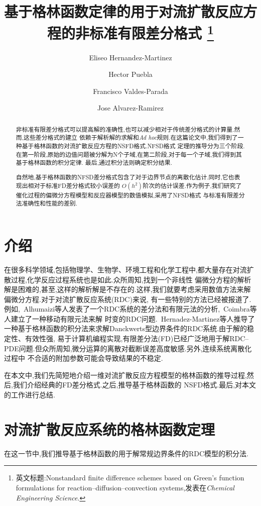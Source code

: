 \documentclass[a4paper,cs4size,adobefonts,cm-default,no-math]{ctexart}
\begin{document}
\setlength{\baselineskip}{22pt}

\title{\kaishu 基于格林函数定律的用于对流扩散反应方程的非标准有限差分格式
      \footnote{英文标题:Nonstandard finite difference schemes based on Green's function
formulations for reaction--diffusion--convection systems,发表在\textit{Chemical Engineering Science}.}}
\author{Eliseo Hernandez-Martinez \and Hector Puebla \and Francisco Valdes-Parada \and Jose Alvarez-Ramirez}
\date{}
\maketitle
\begin{abstract}
非标准有限差分格式可以提高解的准确性,也可以减少相对于传统差分格式的计算量.然而,这些差分格式的建立
依赖于解析解的求解和\textit{Ad hoc}规则.在这篇论文中,我们得到了一种基于格林函数的对流扩散反应方程的NSFD格式.NFSD格式
定理的推导分为三个阶段.在第一阶段,原始的边值问题被分解为N个子域,在第二阶段,对于每一个子域,我们得到其基于格林函数的积分定律.
最后,通过积分法则确定积分结果.\par
自然地,基于格林函数的NFSD差分格式包含了对于边界节点的离散化估计.同时,它也表现出相对于标准FD差分格式较小误差的
$O(h^2)$阶次的估计误差.作为例子,我们研究了催化过程的偏微分方程模型和反应器模型的数值模拟,采用了NFSD格式
与标准有限差分法准确性和性能的差别.
\end{abstract}
\thispagestyle{empty}
\newpage
\section{介绍}
在很多科学领域,包括物理学、生物学、环境工程和化学工程中,都大量存在对流扩散过程,化学反应过程系统也是如此.众所周知,找到一个非线性
偏微分方程的解析解是困难的,甚至,这样的解析解是不存在的.这样,我们就要考虑采用数值方法来解偏微分方程.对于对流扩散反应系统(RDC)来说,
有一些特别的方法已经被报道了.例如,~Alhumaizi等人发表了一个RDC系统的差分法和有限元法的分析,~Coimbra等人建立了一种移动有限元法来解
时变的RDC问题.~Hernadez-Martinez等人推导了一种基于格林函数的积分法来求解Danckwerts型边界条件的RDC系统.由于解的稳定性、有效性强,
易于计算机编程实现,有限差分法(FD)已经广泛地用于解RDC--PDE问题.但众所周知,微分运算的离散对截断误差高度敏感.另外,连续系统离散化过程中
不合适的附加参数可能会导致结果的不稳定.\par
在本文中,我们先简短地介绍一维对流扩散反应方程模型的格林函数的推导过程,然后,我们介绍经典的FD差分格式.之后,推导基于格林函数的
NSFD格式.最后,对本文的工作进行总结.
\section{对流扩散反应系统的格林函数定理}\label{sec:2}
在这一节中,我们推导基于格林函数的用于解常规边界条件的RDC模型的积分法.\par
\end{document}

